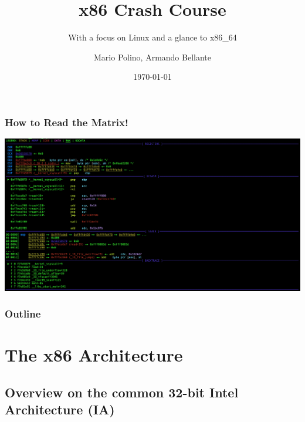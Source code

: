 \documentclass[]{beamer}
\title{x86 Crash Course}
\subtitle{With a focus on Linux and a glance to x86\_64}
\author[NECSTLab]{Mario Polino, Armando Bellante}
\institute{DEIB, Politecnico di Milano}
\date{\today}
\begin{document}
\begin{frame}
	\titlepage
\end{frame}



\begin{frame}
	\frametitle{How to Read the Matrix!}
  \hspace*{-11mm}
  \includegraphics[width=\paperwidth]{./images/pwndbg.png}
\end{frame}
\begin{frame}
  \frametitle{Outline}
  \tableofcontents
\end{frame}

\section{The x86 Architecture}
\subsection{Overview on the common 32-bit Intel Architecture (IA)}
\end{document}
